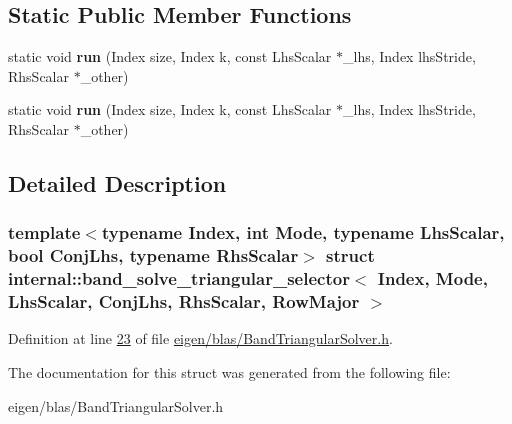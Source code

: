 \subsection*{Static Public Member Functions}
\begin{DoxyCompactItemize}
\item 
\mbox{\label{structinternal_1_1band__solve__triangular__selector_3_01_index_00_01_mode_00_01_lhs_scalar_00_0193d039d924d700ecb916fd425a10f1bb_a501577e1c9c7215362460208701fb12a}} 
static void {\bfseries run} (Index size, Index k, const Lhs\+Scalar $\ast$\+\_\+lhs, Index lhs\+Stride, Rhs\+Scalar $\ast$\+\_\+other)
\item 
\mbox{\label{structinternal_1_1band__solve__triangular__selector_3_01_index_00_01_mode_00_01_lhs_scalar_00_0193d039d924d700ecb916fd425a10f1bb_a501577e1c9c7215362460208701fb12a}} 
static void {\bfseries run} (Index size, Index k, const Lhs\+Scalar $\ast$\+\_\+lhs, Index lhs\+Stride, Rhs\+Scalar $\ast$\+\_\+other)
\end{DoxyCompactItemize}


\subsection{Detailed Description}
\subsubsection*{template$<$typename Index, int Mode, typename Lhs\+Scalar, bool Conj\+Lhs, typename Rhs\+Scalar$>$\newline
struct internal\+::band\+\_\+solve\+\_\+triangular\+\_\+selector$<$ Index, Mode, Lhs\+Scalar, Conj\+Lhs, Rhs\+Scalar, Row\+Major $>$}



Definition at line \hyperlink{eigen_2blas_2_band_triangular_solver_8h_source_l00023}{23} of file \hyperlink{eigen_2blas_2_band_triangular_solver_8h_source}{eigen/blas/\+Band\+Triangular\+Solver.\+h}.



The documentation for this struct was generated from the following file\+:\begin{DoxyCompactItemize}
\item 
eigen/blas/\+Band\+Triangular\+Solver.\+h\end{DoxyCompactItemize}
